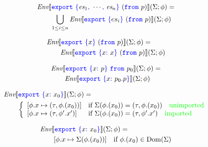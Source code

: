 \documentclass[a4paper]{article}
\newcommand{\code}[1]{\textcolor{blue}{\tt #1}}
\newcommand{\comment}[1]{\mbox{\textcolor{green}{#1}}}
\newcommand{\dom}{\mathop{\mathrm{Dom}}}
\newcommand{\Env}{\emph{Env}}
\newcommand{\If}{\mbox{if}}
\begin{document}
\begin{equation*}
\begin{split}
&\Env \llbracket \code{export}\ \code{\{}\emph{es}_1\code{,}\ \cdots\code{,}\ \emph{es}_n\code{\}}\ (\code{from}\ p) \rrbracket (\Sigma; \phi) = \\
&\qquad\bigcup_{1 \le i \le n} \Env \llbracket \code{export}\ \code{\{}es_i\code{\}}\ (\code{from}\ p) \rrbracket (\Sigma; \phi)
\end{split}
\end{equation*}

\begin{equation*}
\begin{split}
&\Env \llbracket \code{export}\ \code{\{}x\code{\}}\ (\code{from}\ p) \rrbracket (\Sigma; \phi) = \\
&\qquad\Env \llbracket \code{export}\ \code{\{}x\code{:}\ x\code{\}}\ (\code{from}\ p) \rrbracket (\Sigma; \phi)
\end{split}
\end{equation*}

\begin{equation*}
\begin{split}
&\Env \llbracket \code{export}\ \code{\{}x\code{:}\ p\code{\}}\ \code{from}\ p_0 \rrbracket (\Sigma; \phi) = \\
&\qquad\Env \llbracket \code{export}\ \code{\{}x\code{:}\ p_0\code{.}p\code{\}} \rrbracket (\Sigma; \phi)
\end{split}
\end{equation*}

\begin{equation*}
\begin{split}
&\Env \llbracket \code{export}\ \code{\{}x\code{:}\ x_0\code{\}} \rrbracket (\Sigma; \phi) = \\
&\qquad \left\{\begin{array}{ll}
[\phi.x \mapsto (\tau, \phi.(x_0))] & \If\ \Sigma(\phi.(x_0)) = (\tau, \phi.(x_0)) \quad\comment{unimported} \\ {}
[\phi.x \mapsto (\tau, \phi'.x')] & \If\ \Sigma(\phi.(x_0)) = (\tau, \phi'.x') \quad\comment{imported}
\end{array}\right.
\end{split}
\end{equation*}

\begin{equation*}
\begin{split}
&\Env \llbracket \code{export}\ \code{\{}x\code{:}\ x_0\code{\}} \rrbracket (\Sigma; \phi) = \\
&\qquad [\phi.x \mapsto \Sigma(\phi.(x_0))] \quad \If\ \phi.(x_0) \in \dom(\Sigma)
\end{split}
\end{equation*}
\end{document}
